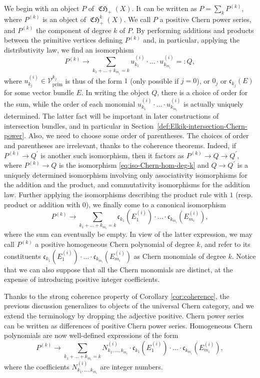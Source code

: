 \documentclass[11pt]{article}
\newcommand{\resp}{resp.\xspace}
\theoremstyle{plain}
\theoremstyle{definition}
\newcommand{\Vcal}{\mathcal V}
\newcommand{\cfrak}{\mathfrak c}
\newcommand{\prim}{\mathrm{prim}}
\DeclareMathOperator{\CHfrak}{\mathfrak{CH}}
\begin{document}
We begin with an object $P$ of $\CHfrak_{+}(X)$. It can be written as $P=\sum_{k}P^{(k)}$, where $P^{(k)}$ is an object of $\CHfrak^{k}_{+}(X)$. We call $P$ a positive Chern power series, and $P^{(k)}$ the component of degree $k$ of $P$. By performing additions and products between the primitive vertices defining $P^{(k)}$ and, in particular, applying the distributivity law, we find an isomorphism
\begin{equation}\label{eq:iso-Chern-hom-deg-k}
P^{(k)}\to \sum_{k_{1}+\ldots+k_{m_{i}}=k}u_{k_{1}}^{(i)}\cdot\ldots\cdot u_{k_{m_{i}}}^{(i)}=:Q,
\end{equation}
where $u_{k_{j}}^{(i)}\in\Vcal^{k_{j}}_{\prim}$ is thus of the form $1$ (only possible if $j=0$), or $0_{j}$ or $\cfrak_{k_{j}}(E)$ for some vector bundle $E$. In writing the object $Q$, there is a choice of order for the sum, while the order of each monomial $u_{k_{1}}^{(i)}\cdot\ldots\cdot u_{k_{m_{i}}}^{(i)}$ is actually uniquely determined. The latter fact will be important in later constructions of intersection bundles, and in particular in Section~\ref{def:Elkik-intersection-Chern-power}. Also, we need to choose some order of parentheses. The choices of order and parentheses are irrelevant, thanks to the coherence theorems. Indeed, if $P^{(k)}\to Q^{\prime}$ is another such isomorphism, then it factors as $P^{(k)}\to Q\to Q^{\prime}$, where $P^{(k)}\to Q$ is the isomorphism \eqref{eq:iso-Chern-hom-deg-k} and $Q\to Q^{\prime}$ is a uniquely determined isomorphism involving only associativity isomorphisms for the addition and the product, and commutativity isomorphisms for the addition law. Further applying the isomorphisms describing the product rule with $1$ (\resp product or addition with $0$), we finally come to a canonical isomorphism
\begin{equation}\label{eq:iso-Chern-hom-deg-k-bis}
P^{(k)}\to \sum_{k_{1}+\ldots+k_{m_{i}}=k}\cfrak_{k_{1}}(E_{1}^{(i)})\cdot\ldots\cdot \cfrak_{k_{m_{i}}}(E_{m_{i}}^{(i)}),
\end{equation}
where the sum can eventually be empty. In view of the latter expression, we may call $P^{(k)}$ a positive homogeneous Chern polynomial of degree $k$, and refer to its constituents $\cfrak_{k_{1}}(E_{1}^{(i)})\cdot\ldots\cdot \cfrak_{k_{m_{i}}}(E_{m_{i}}^{(i)})$ as Chern monomials of degree $k$. Notice that we can also suppose that all the Chern monomials are distinct, at the expense of introducing positive integer coefficients.

Thanks to the strong coherence property of Corollary \ref{cor:coherence}, the previous discussion generalizes to objects of the universal Chern category, and we extend the terminology by dropping the adjective positive. Chern power series can be written as differences of positive Chern power series. Homogeneous Chern polynomials are now well-defined expressions of the form
\begin{displaymath}
P^{(k)}\to \sum_{k_{1}+\ldots+k_{m_{i}}=k}N_{k_{1},\ldots,k_{m_{i}}}^{(i)}\cdot\cfrak_{k_{1}}(E_{1}^{(i)})\cdot\ldots\cdot \cfrak_{k_{m_{i}}}(E_{m_{i}}^{(i)}),
\end{displaymath}
where the coefficients $N_{k_{1},\ldots,k_{m_{i}}}^{(i)}$ are integer numbers.
\end{document}
